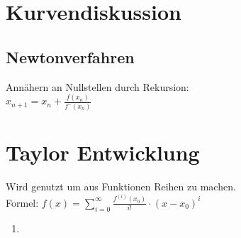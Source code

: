 \documentclass[12pt,a4paper]{article}
\begin{document}
\section{Kurvendiskussion}
	\subsection{Newtonverfahren}
		Annähern an Nullstellen durch Rekursion:\\
		$x_{n+1} = x_n + \frac{f(x_n)}{f´(x_n)}$

\section{Taylor Entwicklung}
	Wird genutzt um aus Funktionen Reihen zu machen.\\ 
	Formel: $f(x) = \sum_{i = 0}^{\infty} \frac{f^{(i)}(x_0)}{i!} \cdot (x-x_0)^i$


	\begin{enumerate}
		\item 
	\end{enumerate}
\end{document}
